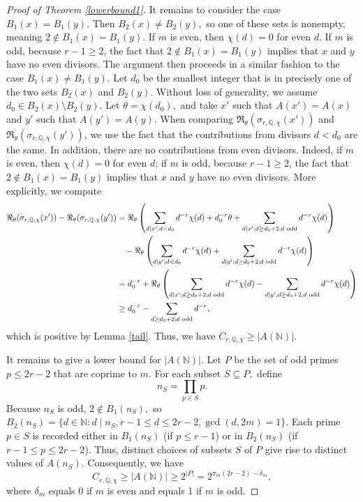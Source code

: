 \documentclass[12pt]{amsart}
\theoremstyle{definition}
\numberwithin{equation}{section}
\newcommand{\Q}{\mathbb{Q}}
\newcommand{\N}{\mathbb{N}}
\begin{document}
\begin{proof}[Proof of Theorem \ref{lowerbound1}]
    It remains to consider the case $B_1(x) = B_1(y).$ Then $B_2(x) \neq B_2(y),$ so one of these sets is nonempty, meaning $2 \not\in B_1(x) = B_1(y).$ If $m$ is even, then $\chi(d) = 0$ for even $d$. If $m$ is odd, because  $r-1 \geq 2$, the fact that $2 \not\in B_1(x) = B_1(y)$ implies that $x$ and $y$ have no even divisors.  The argument then proceeds in a similar fashion to the case $B_1(x) \neq B_1(y).$ Let $d_0$ be the smallest integer that is in precisely one of the two sets $B_2(x)$ and $B_2(y).$ Without loss of generality, we assume $d_0 \in B_2(x) \setminus B_2(y).$ Let $\theta = \chi(d_0),$ and take $x'$ such that $A(x') = A(x)$ and $y'$ such that $A(y') = A(y).$ When comparing $\Re_\theta(\sigma_{r,\Q,\chi}(x'))$ and $\Re_\theta(\sigma_{r,\Q,\chi}(y'))$, we use the fact that the contributions from divisors $d < d_0$ are the same. In addition, there are no contributions from even divisors. Indeed, if $m$ is even, then $\chi(d) = 0$ for even $d$; if $m$ is odd, because  $r-1 \geq 2$, the fact that $2 \not\in B_1(x) = B_1(y)$ implies that $x$ and $y$ have no even divisors.  More explicitly, we compute 
    \begin{align*}
        \Re_\theta(\sigma_{r,\Q,\chi}(x'))-\Re_\theta(\sigma_{r,\Q,\chi}(y')) &= \Re_\theta \left( \sum_{d \mid x'; d < d_0} d^{-r} \chi(d) + d_0^{-r} \theta + \sum_{d \mid x'; d \geq d_0+2; d \text{ odd}} d^{-r}\chi(d)\right) \\
        &\text{ \; } - \Re_\theta \left( \sum_{d \mid y'; d < d_0} d^{-r} \chi(d) +  \sum_{d \mid y'; d \geq d_0+2; d \text{ odd}} d^{-r}\chi(d)\right) \\
        &= d_0^{-r} + \Re_\theta\left( \sum_{d \mid x'; d \geq d_0+2; d \text{ odd}} d^{-r}\chi(d) - \sum_{d \mid y'; d \geq d_0+2; d \text{ odd}} d^{-r}\chi(d)\right) \\
        &\geq d_0^{-r} - \sum_{d \geq d_0 + 2 ; d \text{ odd}} d^{-r},
    \end{align*}
    which is positive by Lemma \ref{tail}. Thus, we have $C_{r, \Q, \chi} \geq |A(\mathbb N)|.$ 

    It remains to give a lower bound for $|A(\N)|.$ Let $P$ be the set of odd primes $p \leq 2r-2$ that are coprime to $m$. For each subset $S \subseteq P,$ define $$n_S = \prod_{p \in S} p .$$ Because $n_S$ is odd, $2 \not\in B_1(n_S),$ so $B_2(n_S) = \{d \in \N : d \mid n_S, r-1 \leq d \leq 2r-2, \gcd(d, 2m) = 1\}.$ Each prime $p \in S$ is recorded either in $B_1(n_S)$ (if $p \leq r-1$) or in $B_2(n_S)$ (if $r-1\leq p \leq 2r-2$). Thus, distinct choices of subsets $S$ of $P$ give rise to distinct values of $A(n_S)$. Consequently, we have $$C_{r, \Q, \chi} \geq |A(\mathbb N)| \geq 2^{|P|} = 2^{\pi_m(2r-2) - \delta_m},$$ where $\delta_m$ equals 0 if $m$ is even and equals 1 if $m$ is odd.
\end{proof}
\end{document}
